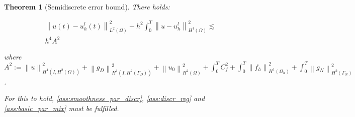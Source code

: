 \documentclass[english,a4paper,10pt,oneside]{scrbook}	%
\theoremstyle{break}
\newtheorem{thm}[equation]{Theorem}
\theoremstyle{remark}
\newcommand{\ds}{\displaystyle}
\newcommand{\norm}[1]{\left\lVert#1\right\rVert}
\begin{document}
\begin{thm}[Semidiscrete error bound]
\label{thm:semidiscrete_error_bound}
There holds:

\begin{align*}
	 \norm{u(t)-u_h^l(t)}_{L^2(\Omega)}^2 + h^{2}\int_0^T\norm{u-u_h^l}^2_{H^1(\Omega)} \lesssim\\
	 h^4A^2
\end{align*}

where $A^2:= \ds \norm{u}_{H^1(I,H^2(\Omega))}^2 + \norm{g_D}_{H^1(I,H^2(\Gamma_D))}^2 + \norm{u_0}_{H^2(\Omega)}^2 +  \int_0^T C_f^2+ \int_0^T \norm{f_h}_{H^1(\Omega_h)}^2 + \int_0^T  \norm{g_N}_{H^2(\Gamma_N)}^2 $.

For this to hold, \cref{ass:smoothness_par_discr}, \cref{ass:discr_reg} and \cref{ass:basic_par_mix} must be fulfilled.

\end{thm}
\end{document}

